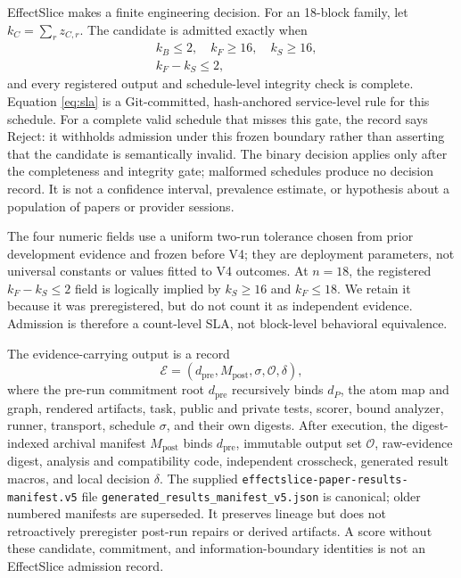 \documentclass[letterpaper]{article} %
\begin{document}
EffectSlice makes a finite engineering decision.  For an 18-block family, let
$k_C=\sum_r z_{C,r}$.  The candidate is admitted exactly when
\begin{equation}
\begin{split}
&k_B\leq 2,\quad k_F\geq 16,\quad k_S\geq 16,\\
&k_F-k_S\leq 2,
\end{split}
\label{eq:sla}
\end{equation}
and every registered output and schedule-level integrity check is complete.  Equation
\ref{eq:sla} is a Git-committed, hash-anchored service-level rule for this schedule.
For a complete valid schedule that misses this gate, the record says Reject: it
withholds admission under this frozen boundary rather than asserting that the
candidate is semantically invalid.  The binary decision applies only after the
completeness and integrity gate; malformed schedules produce no decision record.
It is not a confidence interval, prevalence estimate, or hypothesis about a
population of papers or provider sessions.

The four numeric fields use a uniform two-run tolerance chosen from prior
development evidence and frozen before V4; they are deployment parameters, not
universal constants or values fitted to V4 outcomes.  At $n=18$, the registered
$k_F-k_S\leq2$ field is logically implied by $k_S\geq16$ and $k_F\leq18$.  We
retain it because it was preregistered, but do not count it as independent
evidence.  Admission is therefore a count-level SLA, not block-level behavioral
equivalence.

The evidence-carrying output is a record
\begin{equation}
\mathcal{E}=(d_{\mathrm{pre}},M_{\mathrm{post}},\sigma,\mathcal{O},\delta),
\end{equation}
where the pre-run commitment root $d_{\mathrm{pre}}$ recursively binds $d_P$,
the atom map and graph, rendered artifacts, task, public and private tests,
scorer, bound analyzer, runner, transport, schedule $\sigma$, and their own
digests.  After execution, the digest-indexed archival manifest $M_{\mathrm{post}}$ binds
$d_{\mathrm{pre}}$, immutable output set $\mathcal{O}$, raw-evidence digest,
analysis and compatibility code, independent crosscheck, generated result
macros, and local decision $\delta$.  The supplied
\texttt{effectslice-paper-results-manifest.v5} file
\texttt{generated\_results\_manifest\_v5.json} is canonical; older numbered
manifests are superseded.  It preserves lineage but does not
retroactively preregister post-run repairs or derived artifacts.  A score
without these candidate, commitment, and information-boundary identities is not
an EffectSlice admission record.
\end{document}
